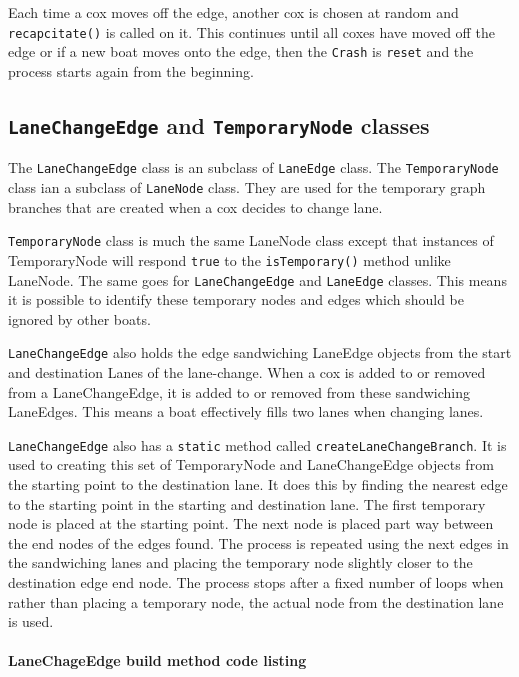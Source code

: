 Each time a cox moves off the edge, another cox is chosen at
random and \texttt{recapcitate()} is called on it. This continues
until all coxes have moved off the edge or if a new boat moves onto
the edge, then the \texttt{Crash} is \texttt{reset} and the process starts
again from the beginning.

\subsection{\texttt{LaneChangeEdge} and \texttt{TemporaryNode} classes}\label{software:lane:lanechange}

The \texttt{LaneChangeEdge} class is an subclass of \texttt{LaneEdge} class. The
\texttt{TemporaryNode} class ian a subclass of \texttt{LaneNode} class. They are used
for the temporary graph branches that are created when a cox decides
to change lane.

\texttt{TemporaryNode} class is much the same LaneNode class except that
instances of TemporaryNode will respond \texttt{true} to the
\texttt{isTemporary()} method unlike
LaneNode. The same goes for \texttt{LaneChangeEdge} and \texttt{LaneEdge} classes. This
means it is possible to identify these temporary nodes and edges which
should be ignored by other boats.

\texttt{LaneChangeEdge} also holds the edge sandwiching LaneEdge objects from
the start and destination Lanes of the lane-change. When a cox is
added to or removed from a LaneChangeEdge, it is added to or removed
from these sandwiching LaneEdges. This means a boat effectively fills
two lanes when changing lanes.

\texttt{LaneChangeEdge} also has a \texttt{static} method called \texttt{createLaneChangeBranch}. It is used to creating this
set of TemporaryNode and LaneChangeEdge objects from the starting
point to the destination lane. It does this by finding the nearest
edge to the starting point in the starting and destination lane. The
first temporary node is placed at the starting point. The next node is
placed part way between the end nodes of the edges found. The process
is repeated using the next edges in the sandwiching lanes and placing
the temporary node slightly closer to the destination edge end
node. The process stops after a fixed number of loops when rather than
placing a temporary node, the actual node from the destination lane is
used.

\paragraph{LaneChageEdge build method code listing}

